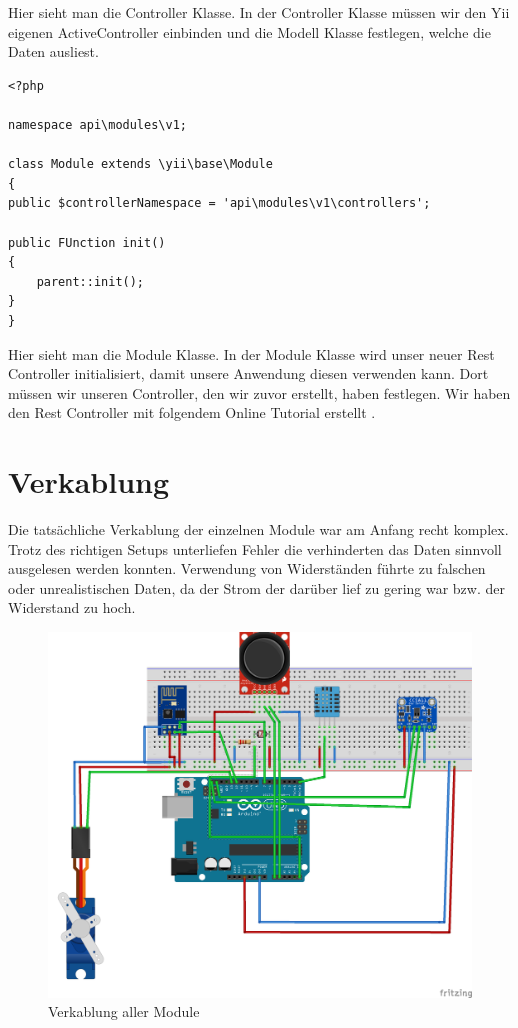 Hier sieht man die Controller Klasse. In der Controller Klasse müssen wir den Yii eigenen ActiveController einbinden und die Modell Klasse festlegen, welche die Daten ausliest.
\begin{lstlisting}[caption=Module Klasse für REST]
<?php

namespace api\modules\v1;

class Module extends \yii\base\Module
{
public $controllerNamespace = 'api\modules\v1\controllers';

public FUnction init()
{
	parent::init();
}
}
\end{lstlisting}                                                                                                                      
Hier sieht man die Module Klasse. In der Module Klasse wird unser neuer Rest Controller initialisiert, damit unsere Anwendung diesen verwenden kann. Dort müssen wir unseren Controller, den wir zuvor erstellt, haben festlegen.
\newline
Wir haben den Rest Controller mit folgendem Online Tutorial erstellt \cite{Restt}.



\newpage

\def \currentAuthor {Kevin Glatz}
\section{Verkablung}

Die tatsächliche Verkablung der einzelnen Module war am Anfang recht komplex. Trotz des richtigen Setups unterliefen Fehler die verhinderten das Daten sinnvoll ausgelesen werden konnten. Verwendung von Widerständen führte zu falschen oder unrealistischen Daten, da der Strom der darüber lief zu gering war bzw. der Widerstand zu hoch. 

\begin{figure}[h]
	\centering
	\includegraphics[width=0.7\linewidth]{figures/allMod}
	\caption{Verkablung aller Module}
	\label{fig:allmod}
\end{figure}

